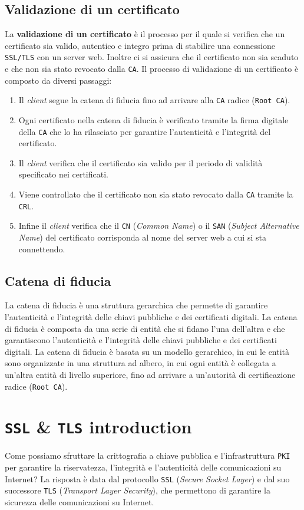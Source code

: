     \subsection{Validazione di un certificato}
        La \textbf{validazione di un certificato} è il processo per il quale si verifica che un certificato sia valido, autentico e integro prima di stabilire una connessione \texttt{SSL/TLS} con un server web. Inoltre ci si assicura che il certificato non sia scaduto e che non sia stato revocato dalla \texttt{CA}. Il processo di validazione di un certificato è composto da diversi passaggi: \begin{enumerate}
            \item Il \textit{client} segue la catena di fiducia fino ad arrivare alla \texttt{CA} radice (\texttt{Root CA}).
            \item Ogni certificato nella catena di fiducia è verificato tramite la firma digitale della \texttt{CA} che lo ha rilasciato per garantire l'autenticità e l'integrità del certificato.
            \item Il \textit{client} verifica che il certificato sia valido per il periodo di validità specificato nei certificati.
            \item Viene controllato che il certificato non sia stato revocato dalla \texttt{CA} tramite la \texttt{CRL}.
            \item Infine il \textit{client} verifica che il \texttt{CN} (\textit{Common Name}) o il \texttt{SAN} (\textit{Subject Alternative Name}) del certificato corrisponda al nome del server web a cui si sta connettendo.
        \end{enumerate}
    \subsection{Catena di fiducia}
        La catena di fiducia è una struttura gerarchica che permette di garantire l'autenticità e l'integrità delle chiavi pubbliche e dei certificati digitali. La catena di fiducia è composta da una serie di entità che si fidano l'una dell'altra e che garantiscono l'autenticità e l'integrità delle chiavi pubbliche e dei certificati digitali. La catena di fiducia è basata su un modello gerarchico, in cui le entità sono organizzate in una struttura ad albero, in cui ogni entità è collegata a un'altra entità di livello superiore, fino ad arrivare a un'autorità di certificazione radice (\texttt{Root CA}).
\section{\texttt{SSL} \& \texttt{TLS} introduction}
    Come possiamo sfruttare la crittografia a chiave pubblica e l'infrastruttura \texttt{PKI} per garantire la riservatezza, l'integrità e l'autenticità delle comunicazioni su Internet? La risposta è data dal protocollo \texttt{SSL} (\textit{Secure Socket Layer}) e dal suo successore \texttt{TLS} (\textit{Transport Layer Security}), che permettono di garantire la sicurezza delle comunicazioni su Internet.
